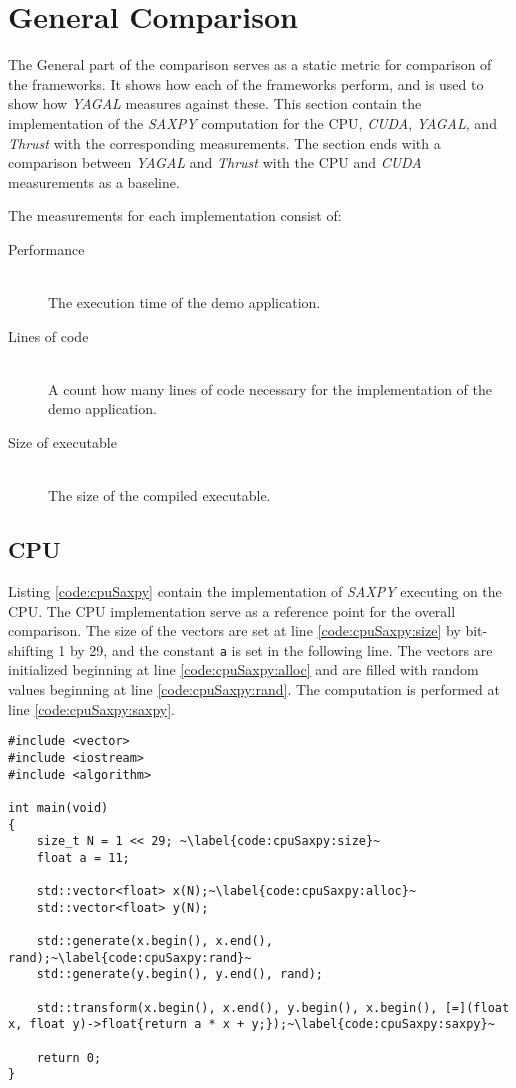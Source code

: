 \section{General Comparison}
The General part of the comparison serves as a static metric for comparison of the frameworks. It shows how each of the frameworks perform, and is used to show how \textit{YAGAL} measures against these. This section contain the implementation of the \textit{SAXPY} computation for the CPU, \textit{CUDA}, \textit{YAGAL}, and \textit{Thrust} with the corresponding measurements. The section ends with a comparison between \textit{YAGAL} and \textit{Thrust} with the CPU and \textit{CUDA} measurements as a baseline.

The measurements for each implementation consist of:
\begin{description}
\item[Performance]\hfill\\
The execution time of the demo application.
\item[Lines of code]\hfill\\
A count how many lines of code necessary for the implementation of the demo application.
\item[Size of executable]\hfill\\
The size of the compiled executable.
\end{description}

\subsection{CPU}
Listing \ref{code:cpuSaxpy} contain the implementation of \textit{SAXPY} executing on the CPU. The CPU implementation serve as a reference point for the overall comparison. The size of the vectors are set at line \ref{code:cpuSaxpy:size} by bit-shifting 1 by 29, and the constant \texttt{a} is set in the following line. The vectors are initialized beginning at line \ref{code:cpuSaxpy:alloc} and are filled with random values beginning at line \ref{code:cpuSaxpy:rand}. The computation is performed at line \ref{code:cpuSaxpy:saxpy}.

\begin{lstlisting}[caption={CPU \textit{SAXPY} implementation.}, label={code:cpuSaxpy}]
#include <vector>
#include <iostream>
#include <algorithm>

int main(void)
{
    size_t N = 1 << 29; ~\label{code:cpuSaxpy:size}~
    float a = 11;

    std::vector<float> x(N);~\label{code:cpuSaxpy:alloc}~
    std::vector<float> y(N);

    std::generate(x.begin(), x.end(), rand);~\label{code:cpuSaxpy:rand}~
    std::generate(y.begin(), y.end(), rand);

    std::transform(x.begin(), x.end(), y.begin(), x.begin(), [=](float x, float y)->float{return a * x + y;});~\label{code:cpuSaxpy:saxpy}~

    return 0;
}
\end{lstlisting}

